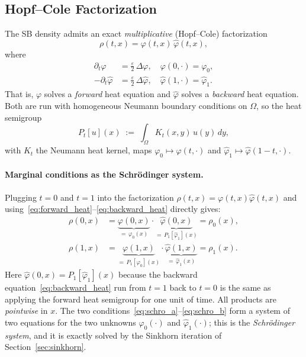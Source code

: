 \documentclass[11pt,a4paper]{article}
\newcommand{\eps}{\varepsilon}
\newcommand{\Pt}[1]{P_{#1}}   %
\begin{document}
\subsection{Hopf--Cole Factorization}\label{sec:hopf_cole}

The SB density admits an exact \emph{multiplicative} (Hopf--Cole)
factorization
\begin{equation}\label{eq:hopf_cole}
  \rho(t,x) = \varphi(t,x)\,\hat\varphi(t,x),
\end{equation}
where
\begin{align}
  \partial_t\varphi       &= \tfrac\eps 2\,\Delta\varphi,
    \quad \varphi(0,\cdot) = \varphi_0, \label{eq:forward_heat}\\
  -\partial_t\hat\varphi  &= \tfrac\eps 2\,\Delta\hat\varphi,
    \quad \hat\varphi(1,\cdot) = \hat\varphi_1. \label{eq:backward_heat}
\end{align}
That is, $\varphi$ solves a \emph{forward} heat equation and $\hat\varphi$
solves a \emph{backward} heat equation.  Both are run with homogeneous
Neumann boundary conditions on $\Omega$, so the heat semigroup
\begin{equation}
  \Pt{t}[u](x) \;:=\; \int_\Omega K_t(x,y)\,u(y)\,dy,
\end{equation}
with $K_t$ the Neumann heat kernel, maps $\varphi_0 \mapsto \varphi(t,\cdot)$
and $\hat\varphi_1 \mapsto \hat\varphi(1-t,\cdot)$.

\paragraph{Marginal conditions as the Schr\"{o}dinger system.}
Plugging $t=0$ and $t=1$ into the factorization $\rho(t,x) = \varphi(t,x)\hat\varphi(t,x)$
and using~\eqref{eq:forward_heat}--\eqref{eq:backward_heat} directly gives:
\begin{align}
  \rho(0,x) &= \underbrace{\varphi(0,x)}_{=\,\varphi_0(x)}
               \cdot
               \underbrace{\hat\varphi(0,x)}_{=\,\Pt{1}[\hat\varphi_1](x)}
             = \rho_0(x), \label{eq:schro_a}\\[6pt]
  \rho(1,x) &= \underbrace{\varphi(1,x)}_{=\,\Pt{1}[\varphi_0](x)}
               \cdot
               \underbrace{\hat\varphi(1,x)}_{=\,\hat\varphi_1(x)}
             = \rho_1(x). \label{eq:schro_b}
\end{align}
Here $\hat\varphi(0,x) = \Pt{1}[\hat\varphi_1](x)$ because the backward
equation~\eqref{eq:backward_heat} run from $t=1$ back to $t=0$ is the
same as applying the forward heat semigroup for one unit of time.
All products are \emph{pointwise} in $x$.
The two conditions~\eqref{eq:schro_a}--\eqref{eq:schro_b} form a system of two
equations for the two unknowns $\varphi_0(\cdot)$ and $\hat\varphi_1(\cdot)$;
this is the \emph{Schr\"{o}dinger system}, and it is exactly solved by the
Sinkhorn iteration of Section~\ref{sec:sinkhorn}.
\end{document}
